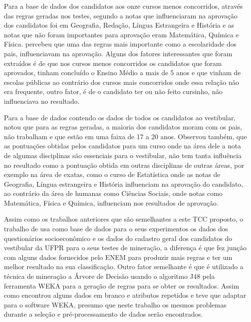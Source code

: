 \par
Para a base de dados dos candidatos aos onze cursos menos concorridos, através das regras geradas nos testes, segundo  a notas que influenciaram na aprovação dos candidatos foi em Geografia, Redação, Língua Estrangeira e História e as notas que não foram importantes para aprovação eram Matemática, Química e Física.  percebeu que uma das regras mais importante como a escolaridade dos pais, influenciavam na aprovação. Alguns dos fatores interessantes que foram extraídos é de que nos cursos menos concorridos os candidatos que foram aprovados, tinham concluído o Ensino Médio a mais de 5 anos e que vinham de escolas públicas ao contrário dos cursos mais concorridos onde essa relação não era frequente, outro fator, é de o candidato ter ou não feito cursinho, não influenciava no resultado.

\par
Para a base de dados contendo os dados de todos os candidatos ao vestibular,  notou que para as regras geradas, a maioria dos candidatos moram com os pais, não trabalham e que estão em uma faixa de 17 a 20 anos. Observou também, que as pontuações obtidas pelos candidatos para um curso onde na área dele a nota de algumas disciplinas são essenciais para o vestibular, não tem tanta influência no resultado como a pontuação obtida em outras disciplinas de outras áreas, por exemplo na área de exatas, como o curso de Estatística onde as notas de Geografia, Língua estrangeira e História influenciam na aprovação do candidato, ao contrário da área de humanas como Ciências Sociais, onde notas como Matemática, Física e Química, influenciam nos resultados de aprovação. 

\par
Assim como os trabalhos anteriores que são semelhantes a este TCC proposto, o trabalho de  usa como base de dados para o seus experimentos os dados dos questionários socioeconômico e os dados do cadastro geral dos candidatos do vestibular da UFPR para o seus testes de mineração, a diferença é que  fez junção com alguns dados fornecidos pelo ENEM para produzir mais regras e ter um melhor resultado na sua classificação. Outro fator semelhante é que é utilizado a técnica de mineração a Árvore de Decisão usando o algoritmo J48 pela ferramenta WEKA para a geração de regras para se obter os resultados. Assim como  encontrou alguns dados em branco e atributos repetidos e teve que adaptar para o software WEKA, presumo que neste trabalho os mesmos problemas durante a seleção e pré-processamento de dados serão encontrados.


